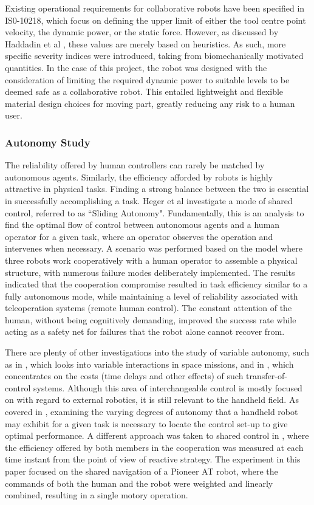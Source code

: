 \documentclass[11pt]{article}
\begin{document}
Existing operational requirements for collaborative robots have been specified in IS0-10218, which focus on defining the upper limit of either the tool centre point velocity, the dynamic power, or the static force. However, as discussed by Haddadin et al \cite{Haddadin2007}, these values are merely based on heuristics. As such, more specific severity indices were introduced, taking from biomechanically motivated quantities. In the case of this project, the robot was designed with the consideration of limiting the required dynamic power to suitable levels to be deemed safe as a collaborative robot. This entailed lightweight and flexible material design choices for moving part, greatly reducing any risk to a human user.

\subsubsection{Autonomy Study}
The reliability offered by human controllers can rarely be matched by autonomous agents. Similarly, the efficiency afforded by robots is highly attractive in physical tasks. Finding a strong balance between the two is essential in successfully accomplishing a task. Heger et al \cite{heger2006} investigate a mode of shared control, referred to as ``Sliding Autonomy". Fundamentally, this is an analysis to find the optimal flow of control between autonomous agents and a human operator for a given task, where an operator observes the operation and intervenes when necessary. A scenario was performed based on the model where three robots work cooperatively with a human operator to assemble a physical structure, with numerous failure modes deliberately implemented. The results indicated that the cooperation compromise resulted in task efficiency similar to a fully autonomous mode, while maintaining a level of reliability associated with teleoperation systems (remote human control). The constant attention of the human, without being cognitively demanding, improved the success rate while acting as a safety net for failures that the robot alone cannot recover from.

There are plenty of other investigations into the study of variable autonomy, such as in \cite{Dorais1999}, which looks into variable interactions in space missions, and in \cite{tambe2002}, which concentrates on the costs (time delays and other effects) of such transfer-of-control systems. Although this area of interchangeable control is mostly focused on with regard to external robotics, it is still relevant to the handheld field. As covered in \cite{GreggSmithDesign}, examining the varying degrees of autonomy that a handheld robot may exhibit for a given task is necessary to locate the control set-up to give optimal performance.
A different approach was taken to shared control in \cite{Poncela2009}, where the efficiency offered by both members in the cooperation was measured at each time instant from the point of view of reactive strategy. The experiment in this paper focused on the shared navigation of a Pioneer AT robot, where the commands of both the human and the robot were weighted and linearly combined, resulting in a single motory operation.
\end{document}
